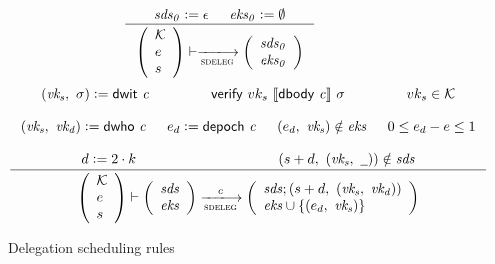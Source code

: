 \begin{figure}[htb]
  \begin{equation}
    \label{eq:sdeleg-bootstrap}
    \inference
    {
      \var{sds_0} \leteq \epsilon
      &
      \var{eks_0} \leteq \emptyset
    }
    {
      {\left(\begin{array}{l}
       \mathcal{K}\\
        e\\
        s
      \end{array}\right)}
      \vdash
      \trans{sdeleg}{}
      \left(
        \begin{array}{l}
          \var{sds_0}\\
          \var{eks_0}
        \end{array}
      \right)
    }
  \end{equation}
  \nextdef
  \begin{equation}
    \label{eq:rule:delegation-scheduling}
    \inference
    {
      (\var{vk_s},~ \sigma) \leteq \dwit{c}
      & \verify{vk_s}{\serialised{\dbody{c}}}{\sigma} & vk_s \in \mathcal{K}\\ ~ \\
      (\var{vk_s},~ \var{vk_d}) \leteq \dwho{c} & e_d \leteq \depoch{c}
      & (e_d,~ \var{vk_s}) \notin \var{eks} & 0 \leq e_d - e \leq 1 \\ ~ \\
      d \leteq 2 \cdot k & (s + d,~ (\var{vk_s},~ \wcard)) \notin \var{sds}\\
    }
    {
      {\left(\begin{array}{l}
       \mathcal{K}\\
        e\\
        s
      \end{array}\right)}
      \vdash
      {
        \left(
          \begin{array}{l}
            \var{sds}\\
            \var{eks}
          \end{array}
        \right)
      }
      \trans{sdeleg}{c}
      {
        \left(
          \begin{array}{l}
            \var{sds}; (s + d,~ (\var{vk_s},~ \var{vk_d}))\\
            \var{eks} \cup \{(e_d,~ \var{vk_s})\}
          \end{array}
        \right)
      }
    }
  \end{equation}
  \caption{Delegation scheduling rules}
  \label{fig:rules:delegation-scheduling}
\end{figure}

